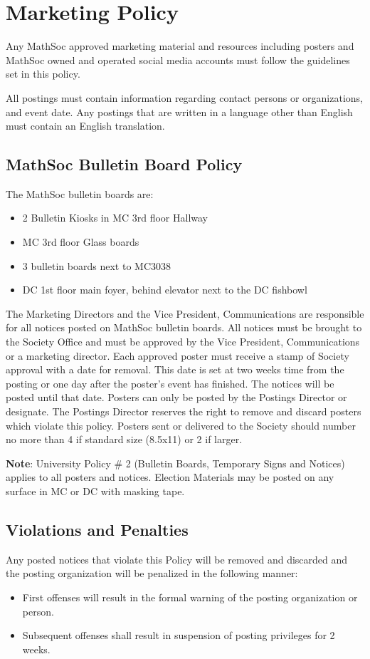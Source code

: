 \section{Marketing Policy}

Any MathSoc approved marketing material and resources including posters and MathSoc owned and operated social media accounts must follow the guidelines set in this policy. 

All postings must contain information regarding contact persons or organizations, and event date.
Any postings that are written in a language other than English must contain an English translation. 

\subsection{MathSoc Bulletin Board Policy}

The MathSoc bulletin boards are: 
\begin{itemize}
    \item 2 Bulletin Kiosks in MC 3rd floor Hallway 
    \item MC 3rd floor Glass boards 
    \item 3 bulletin boards next to MC3038 
    \item DC 1st floor main foyer, behind elevator next to the DC fishbowl 
\end{itemize}

The Marketing Directors and the Vice President, Communications are responsible for all notices posted on  MathSoc bulletin boards. 
All notices must be brought to the Society Office and must be approved by the  Vice President, Communications or a marketing director. 
Each approved poster must receive a stamp of Society  approval with a date for removal. 
This date is set at two weeks time from the posting or one day after the  poster's event has finished. 
The notices will be posted until that date. 
Posters can only be posted by the  Postings Director or designate. 
The Postings Director reserves the right to remove and discard posters  which violate this policy. 
Posters sent or delivered to the Society should number no more than 4 if  standard size (8.5x11) or 2 if larger. 

\textbf{Note}: University Policy \# 2 (Bulletin Boards, Temporary Signs and Notices) applies to all posters and  notices. Election Materials may be posted on any surface in MC or DC with masking tape. 

\subsection{Violations and Penalties}

Any posted notices that violate this Policy will be removed and discarded and the posting organization  will be penalized in the following manner: 
\begin{itemize}
    \item First offenses will result in the formal warning of the posting organization or person.
    \item Subsequent offenses shall result in suspension of posting privileges for 2 weeks.
\end{itemize}
